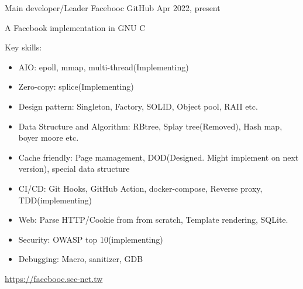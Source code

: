 

\begin{cventries}

    \cventry
    {Main developer/Leader}
    {Facebooc}
    {GitHub} %
    {Apr 2022, present} %
    {
        \begin{cvitems} %
            \item {A Facebook implementation in GNU C}
            \item {Key skills:}
            \begin{itemize}
                \item AIO: epoll, mmap, multi-thread(Implementing)
                \item Zero-copy: splice(Implementing)
                \item Design pattern: Singleton, Factory, SOLID, Object pool, RAII etc.
                \item Data Structure and Algorithm: RBtree, Splay tree(Removed), Hash map, boyer moore etc.
                \item Cache friendly: Page mamagement, DOD(Designed. Might implement on next version), special data structure
                \item CI/CD: Git Hooks, GitHub Action, docker-compose, Reverse proxy, TDD(implementing)
                \item Web: Parse HTTP/Cookie from from scratch, Template rendering, SQLite. 
                \item Security: OWASP top 10(implementing)
                \item Debugging: Macro, sanitizer, GDB
            \end{itemize} 
            \item {\url{https://facebooc.scc-net.tw}}
        \end{cvitems}
    }


\end{cventries}
